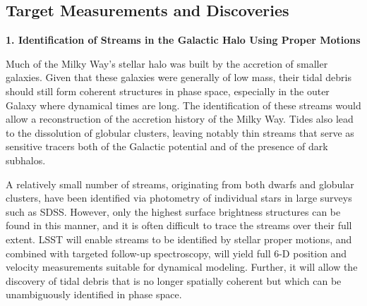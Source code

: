 
\subsection{Target Measurements and Discoveries}
\label{sec:\secname:MW_Astrometry_measurements}


{\bf 1. Identification of Streams in the Galactic Halo Using Proper Motions}

Much of the Milky Way's stellar halo was built by the accretion of smaller galaxies. Given that these galaxies
were generally of low mass, their tidal debris should still form coherent structures in phase space, especially
in the outer Galaxy where dynamical times are long. The identification of these streams would allow
a reconstruction of the accretion history of the Milky Way. Tides also lead to the dissolution of globular clusters,
leaving notably thin streams that serve as sensitive tracers both of the Galactic potential and of the presence of dark
subhalos.

A relatively small number of streams, originating from both dwarfs and globular clusters, have been identified via photometry
of individual stars in large surveys such as SDSS\@. However, only the highest surface brightness structures can be found
in this manner, and it is often difficult to trace the streams over their full extent. LSST will enable streams to be identified
by stellar proper motions, and combined with targeted follow-up spectroscopy, will yield full 6-D position and velocity measurements suitable for dynamical modeling.
Further, it will allow the discovery of tidal debris that is no longer spatially coherent but which can be unambiguously identified in phase space.

